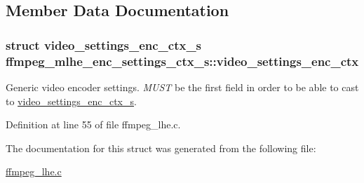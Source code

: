 \subsection{Member Data Documentation}
\subsubsection[{\texorpdfstring{video\+\_\+settings\+\_\+enc\+\_\+ctx}{video_settings_enc_ctx}}]{\setlength{\rightskip}{0pt plus 5cm}struct {\bf video\+\_\+settings\+\_\+enc\+\_\+ctx\+\_\+s} ffmpeg\+\_\+mlhe\+\_\+enc\+\_\+settings\+\_\+ctx\+\_\+s\+::video\+\_\+settings\+\_\+enc\+\_\+ctx}\hypertarget{structffmpeg__mlhe__enc__settings__ctx__s_a683893565bbe4cfec2a3ae10fc7aeb3c}{}\label{structffmpeg__mlhe__enc__settings__ctx__s_a683893565bbe4cfec2a3ae10fc7aeb3c}
Generic video encoder settings. {\itshape M\+U\+ST} be the first field in order to be able to cast to \hyperlink{structvideo__settings__enc__ctx__s}{video\+\_\+settings\+\_\+enc\+\_\+ctx\+\_\+s}. 

Definition at line 55 of file ffmpeg\+\_\+lhe.\+c.



The documentation for this struct was generated from the following file\+:\begin{DoxyCompactItemize}
\item 
\hyperlink{ffmpeg__lhe_8c}{ffmpeg\+\_\+lhe.\+c}\end{DoxyCompactItemize}
